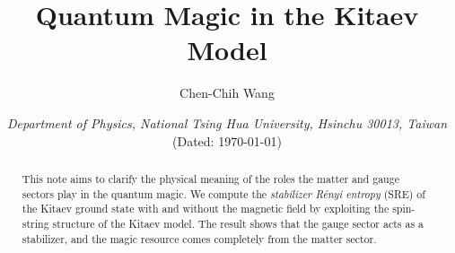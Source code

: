 \documentclass[12font]{article}
\title{\textbf{Quantum Magic in the Kitaev Model}}
\author{Chen-Chih Wang  }
\date{\textit{Department of Physics, National Tsing Hua University, Hsinchu 30013, Taiwan} \\ (Dated: \today)}
\numberwithin{equation}{section}    %
\theoremstyle{definition}
\begin{document}
\maketitle
\renewcommand\qedsymbol{$\blacksquare$}



\fontsize{12pt}{16pt}\selectfont

\begin{abstract}
    This note aims to clarify the physical meaning of the roles the matter and gauge sectors play in the quantum magic. We compute the \textit{stabilizer R\'enyi entropy} (SRE) of the Kitaev ground state with and without the magnetic field by exploiting the spin-string structure of the Kitaev model. The result shows that the gauge sector acts as a stabilizer, and the magic resource comes completely from the matter sector.
\end{abstract}

\tableofcontents




\appendix








\end{document}
